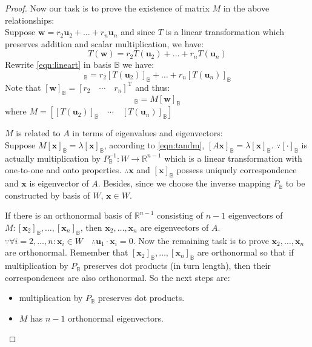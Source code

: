 \begin{proof}
Now our task is to prove the existence of matrix $M$ in the above
relationships:\\
Suppose $\mathbf{w}=r_{2}\mathbf{u}_{2}+\ldots+r_{n}\mathbf{u}_{n}$
and since $T$ is a linear transformation which preserves addition and
scalar multiplication, we have:
\begin{equation}
T(\mathbf{w})=r_{2}T(\mathbf{u}_2)+\ldots+r_{n}T(\mathbf{u}_{n})
\label{eqn:lineart}
\end{equation}
Rewrite \eqref{eqn:lineart} in basis $\mathbb{B}$ we have:
\begin{equation}
[T(\mathbf{w})]_{\mathbb{B}}=r_{2}[T(\mathbf{u}_2)]_{\mathbb{B}}+\ldots+r_{n}[T(\mathbf{u}_{n})]_{\mathbb{B}}
\end{equation}
Note that
$[\mathbf{w}]_{\mathbb{B}}=[r_{2}\quad{}\cdots{}\quad{}r_{n}]^{\mathrm{T}}$
and thus:
\begin{equation}
[T(\mathbf{w})]_{\mathbb{B}}=M[\mathbf{w}]_{\mathbb{B}}
\label{eqn:tandm}
\end{equation}
where
$M=[[T(\mathbf{u}_2)]_{\mathbb{B}}\quad{}\cdots{}\quad{}[T(\mathbf{u}_{n})]_{\mathbb{B}}]$


$M$ is related to $A$ in terms of eigenvalues and eigenvectors:\\
Suppose
$M[\mathbf{x}]_{\mathbb{B}}=\lambda{}[\mathbf{x}]_{\mathbb{B}}$,
    according to \eqref{eqn:tandm},
    $[A\mathbf{x}]_{\mathbb{B}}=\lambda{}[\mathbf{x}]_{\mathbb{B}}$.
    $\because{}[\cdot]_{\mathbb{B}}$ is actually multiplication by
    $P_{\mathbb{B}}^{-1}:W\rightarrow{}\mathbb{R}^{n-1}$ which is
    a linear transformation with one-to-one and onto properties.
    $\therefore{}\mathbf{x}$ and $[\mathbf{x}]_{\mathbb{B}}$ possess
    uniquely correspondence and $\mathbf{x}$ is eigenvector of $A$.
    Besides, since we choose the inverse mapping $P_{\mathbb{B}}$ to
    be constructed by basis of $W$, $\mathbf{x}\in{}W$.


If there is an orthonormal basis of $\mathbb{R}^{n-1}$ consisting of
$n-1$ eigenvectors of
$M:[\mathbf{x}_2]_{\mathbb{B}},\ldots,[\mathbf{x}_{n}]_{\mathbb{B}}$,
    then $\mathbf{x}_{2},\ldots,\mathbf{x}_{n}$ are eigenvectors of
    $A$.
    $\because{}\forall{}i=2,\ldots,n:\mathbf{x}_{i}\in{}W\quad{}\therefore{}\mathbf{u}_{1}\cdot{}\mathbf{x}_{i}=0$.
    Now the remaining task is to prove
    $\mathbf{x}_{2},\ldots,\mathbf{x}_{n}$ are orthonormal. Remember that
    $[\mathbf{x}_{2}]_{\mathbb{B}},\ldots,[\mathbf{x}_{n}]_{\mathbb{B}}$
    are orthonormal so that if multiplication by $P_{\mathbb{B}}$
    preserves dot products (in turn length), then their
    correspondences are also orthonormal. So the next steps are:
\begin{itemize}
\item multiplication by $P_{\mathbb{B}}$ preserves dot products.
\item $M$ has $n-1$ orthonormal eigenvectors.
\end{itemize}



\end{proof}
